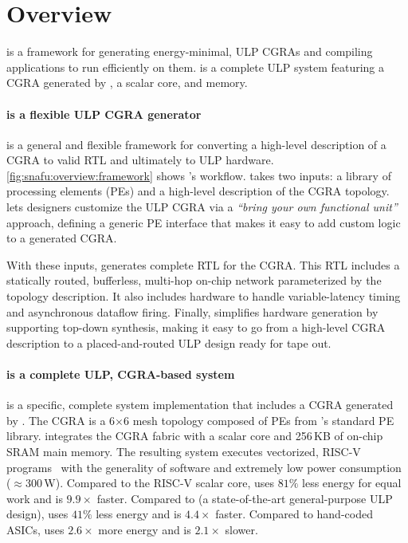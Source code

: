 \section{Overview}
\label{snafu:overview}

\snafuframe is a framework for generating energy-minimal, ULP CGRAs
and compiling applications to run efficiently on them.
%
\snafuarch is a complete ULP system featuring a CGRA generated by \snafuframe,
a scalar core, and memory.

\figSNAFUOverviewFramework
\paragraph{\snafuframe is a flexible ULP CGRA generator}
\snafuframe is a general and flexible framework for converting a high-level
description of a CGRA to valid RTL and ultimately to ULP hardware.
% 
\autoref{fig:snafu:overview:framework} shows \snafuframe's workflow.
% 
\snafuframe takes two inputs: a library of processing elements (PEs) and a high-level description of the CGRA topology.
% 
\snafuframe lets designers customize the ULP CGRA
%
via a {\em ``bring your own functional unit''} approach,
defining a generic PE interface that makes it easy to add custom logic to a generated CGRA.

With these inputs, \snafuframe generates complete RTL for the CGRA.
% 
This RTL includes a statically routed, bufferless, multi-hop on-chip network parameterized by the topology description.
% 
It also includes hardware to handle variable-latency timing and asynchronous dataflow firing.
%
Finally, \snafuframe simplifies hardware generation by supporting top-down synthesis,
making it easy to go from a high-level CGRA description to a placed-and-routed ULP design ready for tape out.

\paragraph{\snafuarch is a complete ULP, CGRA-based system}
\snafuarch is a specific, complete system implementation that includes a CGRA generated by \snafuframe.
The CGRA is a 6$\times$6 mesh topology composed of PEs from \snafuframe's standard PE library.
%
\snafuarch integrates the CGRA fabric with a scalar core and 256\,KB of on-chip SRAM main memory.
%
The resulting system executes vectorized, RISC-V programs~\cite{riscv_2019}
with the generality of software and extremely low power consumption ($\approx$300\,\textmu W).  
% 
Compared to the \mbox{RISC-V} scalar core, \snafuarch uses $81\%$ less energy for equal work and is $9.9\times$ faster.
% 
Compared to \manic (a state-of-the-art general-purpose ULP design), \snafuarch uses $41\%$ less energy and is $4.4\times$ faster.
%
Compared to hand-coded ASICs, \snafuarch uses $2.6\times$ more energy and is $2.1\times$ slower.


